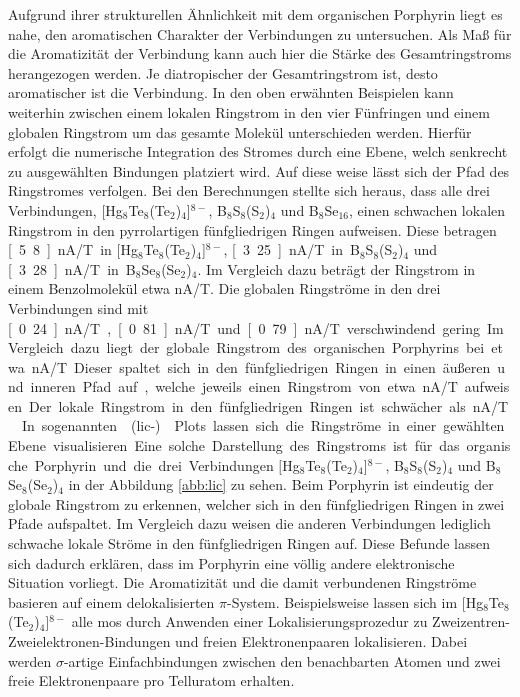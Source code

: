 Aufgrund ihrer strukturellen Ähnlichkeit mit dem organischen Porphyrin liegt es nahe, den aromatischen Charakter der Verbindungen zu untersuchen. Als Maß für die Aromatizität der Verbindung kann auch hier die Stärke des Gesamtringstroms herangezogen werden. Je diatropischer der Gesamtringstrom ist, desto aromatischer ist die Verbindung. In den oben erwähnten Beispielen kann weiterhin zwischen einem lokalen Ringstrom in den vier Fünfringen und einem globalen Ringstrom um das gesamte Molekül unterschieden werden. Hierfür erfolgt die numerische Integration des Stromes durch eine Ebene, welch senkrecht zu ausgewählten Bindungen platziert wird. Auf diese weise lässt sich der Pfad des Ringstromes verfolgen. Bei den Berechnungen stellte sich heraus, dass alle drei Verbindungen, $[$Hg$_8$Te$_8$(Te$_2$)$_4$]$^{8-}$, B$_8$S$_8$(S$_2$)$_4$ und B$_8$Se$_{16}$, einen schwachen lokalen Ringstrom in den pyrrolartigen fünfgliedrigen Ringen aufweisen. Diese betragen \unit[5.8]{nA/T} in $[$Hg$_8$Te$_8$(Te$_2$)$_4$]$^{8-}$, \unit[3.25]{nA/T} in B$_8$S$_8$(S$_2$)$_4$ und \unit[3.28]{nA/T} in B$_8$Se$_8$(Se$_2$)$_4$. Im Vergleich dazu beträgt der Ringstrom in einem Benzolmolekül etwa \unit[12]{nA/T}\supercite{fliegl2012aromatic}. Die globalen Ringströme in den drei Verbindungen sind mit \unit[0.24]{nA/T}, \unit[0.81]{nA/T} und \unit[0.79]{nA/T} verschwindend gering. Im Vergleich dazu liegt der globale Ringstrom des organischen Porphyrins bei etwa \unit[27]{nA/T}. Dieser spaltet sich in den fünfgliedrigen Ringen in einen äußeren und inneren Pfad auf, welche jeweils einen Ringstrom von etwa \unit[13]{nA/T} aufweisen. Der lokale Ringstrom in den fünfgliedrigen Ringen ist schwächer als \unit[1]{nA/T}.\supercite{fliegl2012aromatic} In sogenannten \mbox{(\acs{lic}-)}Plots lassen sich die Ringströme in einer gewählten Ebene visualisieren. Eine solche Darstellung des Ringstroms ist für das organische Porphyrin und die drei Verbindungen $[$Hg$_8$Te$_8$(Te$_2$)$_4$]$^{8-}$, B$_8$S$_8$(S$_2$)$_4$ und B$_8$Se$_8$(Se$_2$)$_4$ in der Abbildung \ref{abb:lic} zu sehen. Beim Porphyrin ist eindeutig der globale Ringstrom zu erkennen, welcher sich in den fünfgliedrigen Ringen in zwei Pfade aufspaltet. Im Vergleich dazu weisen die anderen Verbindungen lediglich schwache lokale Ströme in den fünfgliedrigen Ringen auf.
Diese Befunde lassen sich dadurch erklären, dass im Porphyrin eine völlig andere elektronische Situation vorliegt. Die Aromatizität und die damit verbundenen Ringströme basieren auf einem delokalisierten $\pi$-System. Beispielsweise lassen sich im $[$Hg$_8$Te$_8$(Te$_2$)$_4$]$^{8-}$ alle \acp{mo} durch Anwenden einer Lokalisierungsprozedur\supercite{boys1960sf} zu Zweizentren-Zweielektronen-Bindungen und freien Elektronenpaaren lokalisieren. Dabei werden $\sigma$-artige Einfachbindungen zwischen den benachbarten Atomen und zwei freie Elektronenpaare pro Telluratom erhalten. 

